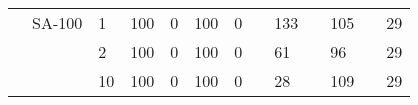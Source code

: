 \begin{tabular}{|P{0.6cm}P{1.1cm}P{0.75cm}||P{0.5cm}P{0.5cm}|P{0.5cm}P{0.5cm}|P{0.5cm}P{0.5cm}|P{0.5cm}P{0.5cm}|P{0.5cm}P{0.5cm}|}
       & SA-100 & 1   &     100 &   0 &  100 &  0 &         &   133 &     &   105 &          &  29 \\
       &       & 2   &     100 &   0 &  100 &   0 &         &    61 &     &    96 &          &  29 \\
       &       & 10  &     100 &   0 &  100 &   0 &          &    28 &     &   109 &          &  29 \\
\hline
\end{tabular}
